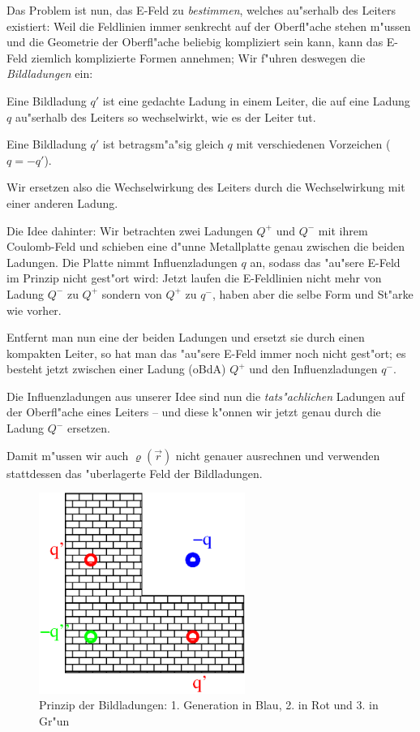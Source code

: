 Das Problem ist nun, das E-Feld zu \emph{bestimmen}, welches au"serhalb
des Leiters existiert: Weil die Feldlinien immer senkrecht auf der
Oberfl"ache stehen m"ussen und die Geometrie der Oberfl"ache beliebig
kompliziert sein kann, kann das E-Feld ziemlich komplizierte Formen
annehmen; Wir f"uhren deswegen die \emph{Bildladungen} ein:
\begin{Def}
    Eine Bildladung $q'$ ist eine
   gedachte Ladung in einem Leiter, die auf eine Ladung $q$ au"serhalb
   des Leiters so wechselwirkt, wie es der Leiter tut.

   Eine Bildladung $q'$ ist betragsm"a"sig gleich $q$ mit
   verschiedenen Vorzeichen ($q =-q'$).
\end{Def}
Wir ersetzen also die Wechselwirkung des Leiters durch die
Wechselwirkung mit einer anderen Ladung.

Die Idee dahinter: Wir betrachten zwei Ladungen $Q^+$ und $Q^-$ mit
ihrem Coulomb-Feld und schieben eine d"unne Metallplatte genau zwischen
die beiden Ladungen. Die Platte nimmt Influenzladungen $q$ an, sodass
das "au"sere E-Feld im Prinzip nicht gest"ort wird: Jetzt laufen die
E-Feldlinien nicht mehr von Ladung $Q^-$ zu $Q^+$ sondern von $Q^+$ zu
$q^-$, haben aber die selbe Form und St"arke wie vorher.

Entfernt man nun eine der beiden Ladungen und ersetzt sie durch einen
kompakten Leiter, so hat man das "au"sere E-Feld immer noch nicht
gest"ort; es besteht jetzt zwischen einer Ladung (oBdA) $Q^+$ und den
Influenzladungen $q^-$.

Die Influenzladungen aus unserer Idee sind nun die
\emph{tats"achlichen} Ladungen auf der Oberfl"ache eines Leiters -- und
diese k"onnen wir jetzt genau durch die Ladung $Q^-$ ersetzen.

Damit m"ussen wir auch $\varrho(\vec r)$ nicht genauer ausrechnen und
verwenden stattdessen das "uberlagerte Feld der Bildladungen.


\begin{figure}
   \centering
   \includegraphics[width=0.6\textwidth]{bilder/bildladung}
   \caption[Bildladungen]{Prinzip der Bildladungen: 1. Generation in
     Blau, 2. in Rot und 3. in Gr"un}
   \label{abb_bildladungen}
\end{figure}





